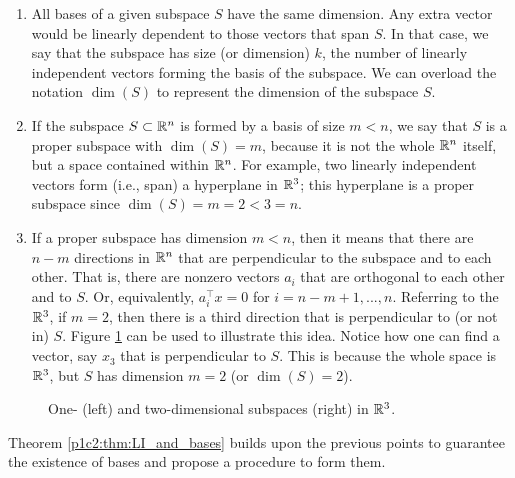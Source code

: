 \begin{enumerate}
	\item All bases of a given subspace $S$ have the same dimension. Any extra vector would be linearly dependent to those vectors that span $S$. In that case, we say that the subspace has size (or dimension) $k$, the number of linearly independent vectors forming the basis of the subspace. We can overload the notation $\dim(S)$ to represent the dimension of the subspace $S$.
	\item If the subspace $S \subset \mathbb{R}^n$ is formed by a basis of size $m < n$, we say that $S$ is a proper subspace with $\dim(S)=m$, because it is not the whole $\mathbb{R}^n$ itself, but a space contained within $\mathbb{R}^n$. For example, two linearly independent vectors form (i.e., span) a hyperplane in $\mathbb{R}^3$; this hyperplane is a proper subspace since $\dim(S)=m=2 < 3=n$.
	\item If a proper subspace has dimension $m < n$, then it means that there are $n-m$ directions in $\mathbb{R}^n$ that are perpendicular to the subspace and to each other. That is, there are nonzero vectors $a_i$ that are orthogonal to each other and to $S$. Or, equivalently, $a_i^\top x = 0$ for $i = n-m + 1, ..., n$. Referring to the $\mathbb{R}^3$, if $m=2$, then there is a third direction that is perpendicular to (or not in) $S$. Figure \ref{p1c2:fig:proper_subpaces} can be used to illustrate this idea. Notice how one can find a vector, say $x_3$ that is perpendicular to $S$. This is because the whole space is $\mathbb{R}^3$, but $S$ has dimension $m=2$ (or $\dim(S)=2$). 
\end{enumerate}

\begin{figure}
	\centering
	\vspace{-12pt}
	\caption{One- (left) and two-dimensional subspaces (right) in $\mathbb{R}^3$.} \label{p1c2:fig:proper_subpaces}
\end{figure}

Theorem \ref{p1c2:thm:LI_and_bases} builds upon the previous points to guarantee the existence of bases and propose a procedure to form them.

